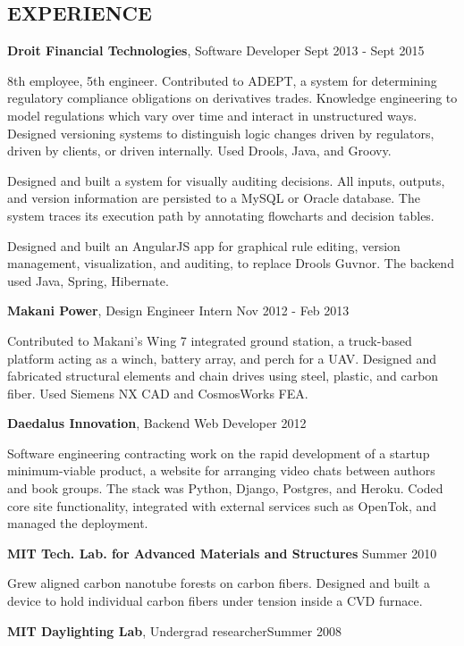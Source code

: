\documentclass[margin]{res}
\begin{document}
\begin{resume}
	\section{EXPERIENCE}%

		{\bf Droit Financial Technologies}, Software Developer \hfill Sept 2013 - Sept 2015
		
		8th employee, 5th engineer. Contributed to ADEPT, a system for determining regulatory compliance obligations on derivatives trades. Knowledge engineering to model regulations which vary over time and interact in unstructured ways. Designed versioning systems to distinguish logic changes driven by regulators, driven by clients, or driven internally. Used Drools, Java, and Groovy.

		Designed and built a system for visually auditing decisions. All inputs, outputs, and version information are persisted to a MySQL or Oracle database. The system traces its execution path by annotating flowcharts and decision tables.

		Designed and built an AngularJS app for graphical rule editing, version management, visualization, and auditing, to replace Drools Guvnor. The backend used Java, Spring, Hibernate.
	

		{\bf Makani Power}, Design Engineer Intern \hfill Nov 2012 - Feb 2013

		Contributed to Makani's Wing 7 integrated ground station, a truck-based platform acting as a winch, battery array, and perch for a UAV. Designed and fabricated structural elements and chain drives using steel, plastic, and carbon fiber. Used Siemens NX CAD and CosmosWorks FEA.


		{\bf Daedalus Innovation}, Backend Web Developer \hfill 2012

		Software engineering contracting work on the rapid development of a startup minimum-viable product, a website for arranging video chats between authors and book groups. The stack was Python, Django, Postgres, and Heroku. Coded core site functionality, integrated with external services such as OpenTok, and managed the deployment. 


		{\bf MIT Tech. Lab. for Advanced Materials and Structures}  \hfill Summer 2010

		Grew aligned carbon nanotube forests on carbon fibers. Designed and built a device to hold individual carbon fibers under tension inside a CVD furnace.


		{\bf MIT Daylighting Lab}, Undergrad researcher\hfill Summer 2008


\end{resume}
\end{document}
